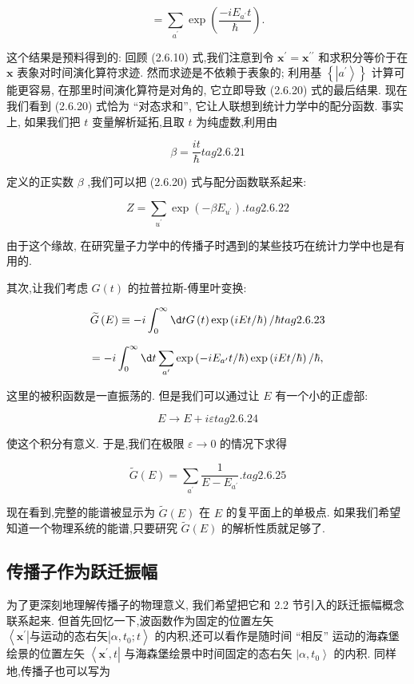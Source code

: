 \documentclass[lang=cn,newtx,10pt,scheme=chinese,thmcnt=section]{elegantbook}
\begin{document}
$$
= \mathop{\sum }\limits_{{a}^{\prime }}\exp \left( \frac{-i{E}_{{a}^{\prime }}t}{\hbar }\right) .
$$

这个结果是预料得到的: 回顾 (2.6.10) 式,我们注意到令 ${\mathbf{x}}^{\prime } = {\mathbf{x}}^{\prime \prime }$ 和求积分等价于在 $\mathbf{x}$ 表象对时间演化算符求迹. 然而求迹是不依赖于表象的; 利用基 $\left\{ \left| {a}^{\prime }\right\rangle \right\}$ 计算可能更容易, 在那里时间演化算符是对角的, 它立即导致 (2.6.20) 式的最后结果. 现在我们看到 (2.6.20) 式恰为 “对态求和”, 它让人联想到统计力学中的配分函数. 事实上, 如果我们把 $t$ 变量解析延拓,且取 $t$ 为纯虚数,利用由

$$
\beta = \frac{it}{\hbar } tag{2.6.21}
$$

定义的正实数 $\beta$ ,我们可以把 (2.6.20) 式与配分函数联系起来:

$$
Z = \mathop{\sum }\limits_{{u}^{\prime }}\exp \left( {-\beta {E}_{{u}^{\prime }}}\right) . tag{2.6.22}
$$

由于这个缘故, 在研究量子力学中的传播子时遇到的某些技巧在统计力学中也是有用的.

其次,让我们考虑 $G\left( t\right)$ 的拉普拉斯-傅里叶变换:

$$
\widetilde{G}\left( E\right) \equiv - i\int_{0}^{\infty }{\d tG}\left( t\right) \exp \left( {{iEt}/\hbar }\right) /\hbar tag{2.6.23}
$$

$$
= - i\int_{0}^{\infty }{\d t}\mathop{\sum }\limits_{{a}^{\prime }}\exp \left( {-i{E}_{{a}^{\prime }}t/\hbar }\right) \exp \left( {{iEt}/\hbar }\right) /\hbar ,
$$

这里的被积函数是一直振荡的. 但是我们可以通过让 $E$ 有一个小的正虚部:

$$
E \rightarrow E + {i\varepsilon } tag{2.6.24}
$$

使这个积分有意义. 于是,我们在极限 $\varepsilon \rightarrow 0$ 的情况下求得

$$
\widetilde{G}\left( E\right) = \mathop{\sum }\limits_{{a}^{\prime }}\frac{1}{E - {E}_{{a}^{\prime }}}. tag{2.6.25}
$$

现在看到,完整的能谱被显示为 $\widetilde{G}\left( E\right)$ 在 $E$ 的复平面上的单极点. 如果我们希望知道一个物理系统的能谱,只要研究 $\widetilde{G}\left( E\right)$ 的解析性质就足够了.

\subsection*{传播子作为跃迁振幅}
为了更深刻地理解传播子的物理意义, 我们希望把它和 2.2 节引入的跃迁振幅概念联系起来. 但首先回忆一下,波函数作为固定的位置左矢 $\left\langle {{\mathbf{x}}^{\prime } | \text{与运动的态右矢} | \alpha ,{t}_{0};t}\right\rangle$ 的内积,还可以看作是随时间 “相反” 运动的海森堡绘景的位置左矢 $\left\langle {{\mathbf{x}}^{\prime }, t}\right|$ 与海森堡绘景中时间固定的态右矢 $\left| {\alpha ,{t}_{0}}\right\rangle$ 的内积. 同样地,传播子也可以写为
\end{document}
